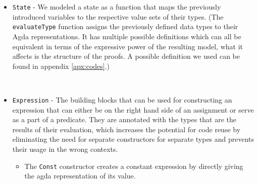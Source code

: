 \begin{itemize}
    \item \verb|State| - We modeled a state as a function that maps the previously introduced variables to the respective value sets of their types. (The \verb|evaluateType| function assigns the previously defined data types to their Agda representations. It has multiple possible definitions which can all be equivalent in terms of the expressive power of the resulting model, what it affects is the structure of the proofs. A possible definition we used can be found in appendix \ref{apx:codes}.)
    \begin{code}
        \>[2]\AgdaSpace{}%
        \AgdaSymbol{:}\AgdaSpace{}%
        \<%
        \\
        \>[2]\AgdaSpace{}%
        \AgdaSymbol{=}\AgdaSpace{}%
        \AgdaSymbol{(}\AgdaSpace{}%
        \AgdaSymbol{:}\AgdaSpace{}%
        \AgdaSymbol{)}\AgdaSpace{}%
        \AgdaSpace{}%
        \AgdaSpace{}%
        \AgdaSymbol{(}\AgdaSpace{}%
        \AgdaSymbol{)}\<%
    \end{code}
    
    \item \verb|Expression| - The building blocks that can be used for constructing an expression that can either be on the right hand side of an assignment or serve as a part of a predicate. They are annotated with the types that are the results of their evaluation, which increases the potential for code reuse by eliminating the need for separate constructors for separate types and prevents their usage in the wrong contexts.
    \begin{code}
        \>[2]\AgdaSpace{}%
        \AgdaSpace{}%
        \AgdaSymbol{:}\AgdaSpace{}%
        \AgdaSpace{}%
        \AgdaSpace{}%
        \AgdaSpace{}%
        \<%
    \end{code}
    \begin{itemize}
        \item The \verb|Const| constructor creates a constant expression by directly giving the agda representation of its value.
        \begin{code}
            \>[4]\AgdaSpace{}%
            \AgdaSymbol{:}\AgdaSpace{}%
            \AgdaSymbol{\{}\AgdaSpace{}%
            \AgdaSymbol{:}\AgdaSpace{}%
            \AgdaSymbol{\}}\AgdaSpace{}%
            \AgdaSpace{}%
            \AgdaSpace{}%
            \AgdaSpace{}%
            \AgdaSpace{}%
            \AgdaSpace{}%
            \<%
        \end{code}
        

\end{itemize}
\end{itemize}
